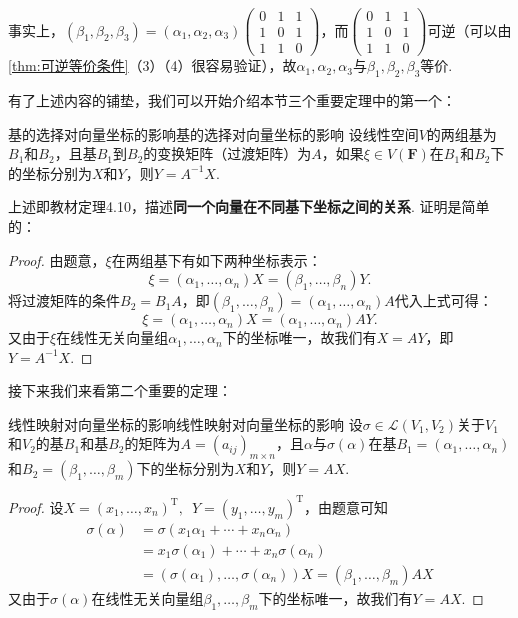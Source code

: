 \begin{solution}
    事实上，$(\beta_1,\beta_2,\beta_3)=(\alpha_1,\alpha_2,\alpha_3)\begin{pmatrix}
            0 & 1 & 1 \\
            1 & 0 & 1 \\
            1 & 1 & 0
        \end{pmatrix}$，而$\begin{pmatrix}
            0 & 1 & 1 \\
            1 & 0 & 1 \\
            1 & 1 & 0
        \end{pmatrix}$可逆（可以由\autoref{thm:可逆等价条件}（3）（4）很容易验证），故$\alpha_1,\alpha_2,\alpha_3$与$\beta_1,\beta_2,\beta_3$等价.
\end{solution}

有了上述内容的铺垫，我们可以开始介绍本节三个重要定理中的第一个：
\begin{theorem}{基的选择对向量坐标的影响}{基的选择对向量坐标的影响}
    设线性空间$V$的两组基为$B_1$和$B_2$，且基$B_1$到$B_2$的变换矩阵（过渡矩阵）为$A$，如果$\xi \in V(\mathbf{F})$在$B_1$和$B_2$下的坐标分别为$X$和$Y$，则$Y=A^{-1}X$.
\end{theorem}
上述即教材定理4.10，描述\textbf{同一个向量在不同基下坐标之间的关系}. 证明是简单的：

\begin{proof}
    由题意，$\xi$在两组基下有如下两种坐标表示：
    \[\xi=(\alpha_1,\ldots,\alpha_n)X=(\beta_1,\ldots,\beta_n)Y.\]
    将过渡矩阵的条件$B_2=B_1A$，即$(\beta_1,\ldots,\beta_n)=(\alpha_1,\ldots,\alpha_n)A$代入上式可得：
    \[\xi=(\alpha_1,\ldots,\alpha_n)X=(\alpha_1,\ldots,\alpha_n)AY.\]
    又由于$\xi$在线性无关向量组$\alpha_1,\ldots,\alpha_n$下的坐标唯一，故我们有$X=AY$，即$Y=A^{-1}X$.
\end{proof}

接下来我们来看第二个重要的定理：
\begin{theorem}{线性映射对向量坐标的影响}{线性映射对向量坐标的影响}
    设$\sigma \in \mathcal{L}(V_1,V_2)$关于$V_1$和$V_2$的基$B_1$和基$B_2$的矩阵为$A=(a_{ij})_{m \times n}$，且$\alpha$与$\sigma(\alpha)$在基$B_1=(\alpha_1,\ldots,\alpha_n)$和$B_2=(\beta_1,\ldots,\beta_m)$下的坐标分别为$X$和$Y$，则$Y=AX$.
\end{theorem}

\begin{proof}
    设$X=(x_1,\ldots,x_n)^\mathrm{T},\enspace Y=(y_1,\ldots,y_m)^\mathrm{T}$，由题意可知
    \begin{align*}
        \sigma(\alpha) & =\sigma(x_1\alpha_1+\cdots+x_n\alpha_n)                                 \\
                       & =x_1\sigma(\alpha_1)+\cdots+x_n\sigma(\alpha_n)                         \\
                       & =(\sigma(\alpha_1),\ldots,\sigma(\alpha_n))X=(\beta_1,\ldots,\beta_m)AX
    \end{align*}
    又由于$\sigma(\alpha)$在线性无关向量组$\beta_1,\ldots,\beta_m$下的坐标唯一，故我们有$Y=AX$.
\end{proof}

